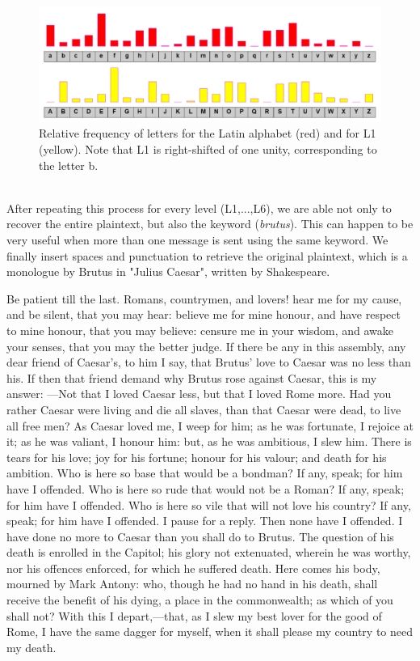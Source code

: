 \documentclass[Lau,binding=0.6cm,oneside]{sapthesis}
\begin{document}
\begin{figure}[H]
\includegraphics[scale=0.43]{kasiski_frequency_L1}
\captionsetup{justification=centering, margin=2cm}
\centering
\caption{Relative frequency of letters for the Latin alphabet (red) and for L1 (yellow). Note that L1 is right-shifted of one unity, corresponding to the letter \textsf{b}.}
\centering
\end{figure}

\ \\
After repeating this process for every level (L1,...,L6), we are able not only to recover the entire plaintext, but also the keyword (\textit{brutus}). This can happen to be very useful when more than one message is sent using the same keyword. We finally insert spaces and punctuation to retrieve the original plaintext, which is a monologue by Brutus in "Julius Caesar", written by Shakespeare.

\begin{displayquote}{\small{\textsf{Be patient till the last. Romans, countrymen, and lovers! hear me for my cause, and be silent, that you may hear: believe me for mine honour, and have respect to mine honour, that you may believe: censure me in your wisdom, and awake your senses, that you may the better judge. If there be any in this assembly, any dear friend of Caesar's, to him I say, that Brutus' love to Caesar was no less than his. If then that friend demand why Brutus rose against Caesar, this is my answer: —Not that I loved Caesar less, but that I loved Rome more. Had you rather Caesar were living and die all slaves, than that Caesar were dead, to live all free men? As Caesar loved me, I weep for him; as he was fortunate, I rejoice at it; as he was valiant, I honour him: but, as he was ambitious, I slew him. There is tears for his love; joy for his fortune; honour for his valour; and death for his ambition. Who is here so base that would be a bondman? If any, speak; for him have I offended. Who is here so rude that would not be a Roman? If any, speak; for him have I offended. Who is here so vile that will not love his country? If any, speak; for him have I offended. I pause for a reply. Then none have I offended. I have done no more to Caesar than you shall do to Brutus. The question of his death is enrolled in the Capitol; his glory not extenuated, wherein he was worthy, nor his offences enforced, for which he suffered death. Here comes his body, mourned by Mark Antony: who, though he had no hand in his death, shall receive the benefit of his dying, a place in the commonwealth; as which of you shall not? With this I depart,—that, as I slew my best lover for the good of Rome, I have the same dagger for myself, when it shall please my country to need my death.}}}
\end{displayquote}
\end{document}
